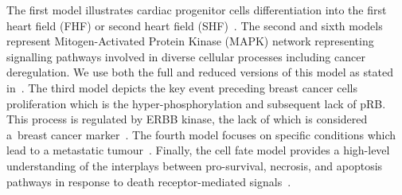 The first model illustrates cardiac progenitor cells differentiation into the first heart field (FHF) or second heart field (SHF)~\cite{Herrmann2012}. The second and sixth models represent Mitogen-Activated Protein Kinase (MAPK) network representing signalling pathways involved in diverse cellular processes including cancer deregulation. We use both the full and reduced versions of this model as stated in~\cite{Grieco2013}. The third model depicts the key event preceding breast cancer cells proliferation which is the hyper-phosphorylation and subsequent lack of pRB. This process is regulated by ERBB kinase, the lack of which is considered a~breast cancer marker~\cite{Sahin2009}. The fourth model focuses on specific conditions which lead to a metastatic tumour~\cite{Cohen2015}. Finally, the cell fate model provides a high-level understanding of the interplays between pro-survival, necrosis, and apoptosis pathways in response to death receptor-mediated signals~\cite{Calzone2010}.


